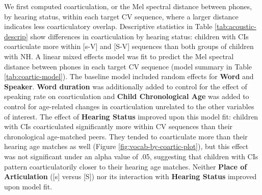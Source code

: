 \documentclass[
]{article}
\begin{document}
We first computed coarticulation, or the Mel spectral distance between phones, by hearing status, within each target CV sequence, where a larger distance indicates less coarticulatory overlap. Descriptive statistics in Table \ref{tab:acoustic-descrip} show differences in coarticulation by hearing status: children with CIs coarticulate more within {[}s-V{]} and {[}S-V{]} sequences than both groups of children with NH. A linear mixed effects model was fit to predict the Mel spectral distance between phones in each target CV sequence (model summary in Table \ref{tab:coartic-model}). The baseline model included random effects for \textbf{Word} and \textbf{Speaker}. \textbf{Word duration} was additionally added to control for the effect of speaking rate on coarticulation and \textbf{Child Chronological Age} was added to control for age-related changes in coarticulation unrelated to the other variables of interest. The effect of \textbf{Hearing Status} improved upon this model fit: children with CIs coarticulated significantly more within CV sequences than their chronological age-matched peers. They tended to coarticulate more than their hearing age matches as well (Figure \ref{fig:vocab-by-coartic-plot}), but this effect was not significant under an alpha value of .05, suggesting that children with CIs pattern coarticulatorily closer to their hearing age matches. Neither \textbf{Place of Articulation} ({[}s{]} versus {[}S{]}) nor its interaction with \textbf{Hearing Status} improved upon model fit.
\end{document}
